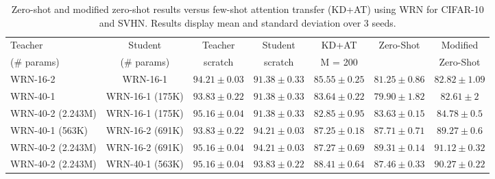 \begin{table}[!ht]
 \begin{adjustwidth}{-1.5cm}{}

    \centering
    \begin{tabular}{lc|ccccc}
    \toprule
    \toprule
         Teacher & Student & Teacher & Student & KD+AT & Zero-Shot & Modified   \\
         (\# params) & (\# params) & scratch & scratch & M = 200 &  & Zero-Shot \\
         \midrule
         WRN-16-2  & WRN-16-1  & $94.21 \pm \scriptstyle{0.03}$ & $91.38\pm \scriptstyle{0.33}$ & $85.55\pm \scriptstyle{0.25}$ & $81.25\pm \scriptstyle{0.86} $ & $82.82\pm \scriptstyle{1.09} $ \\
         WRN-40-1  & WRN-16-1 (175K) & $93.83\pm \scriptstyle{0.22}$ & $91.38\pm \scriptstyle{0.33}$ & $83.64\pm \scriptstyle{0.22}$ & $79.90\pm \scriptstyle{1.82}$ & $82.61\pm \scriptstyle{2}$\\
         WRN-40-2 (2.243M) & WRN-16-1 (175K) & $95.16\pm \scriptstyle{0.04}$ & $91.38\pm \scriptstyle{0.33}$ & $82.85\pm \scriptstyle{0.95}$  & $83.63\pm \scriptstyle{0.15}$ & $84.78\pm \scriptstyle{0.5}$\\
         WRN-40-1 (563K) & WRN-16-2 (691K) & $93.83\pm \scriptstyle{0.22}$ & $94.21\pm \scriptstyle{0.03}$ & $87.25\pm \scriptstyle{0.18}$ & $87.71\pm \scriptstyle{0.71}$ & $89.27\pm \scriptstyle{0.6}$\\ 
         WRN-40-2 (2.243M) & WRN-16-2 (691K) & $95.16\pm \scriptstyle{0.04}$ & $94.21\pm \scriptstyle{0.03}$ & $87.27\pm \scriptstyle{0.69}$ & $89.31\pm \scriptstyle{0.14}$ & $91.12\pm \scriptstyle{0.32}$\\ 
         WRN-40-2 (2.243M) & WRN-40-1 (563K) & $95.16\pm \scriptstyle{0.04}$ & $93.83\pm \scriptstyle{0.22}$ & $88.41\pm \scriptstyle{0.64}$ & $87.46\pm \scriptstyle{0.33}$ & $90.27\pm \scriptstyle{0.22}$\\ 
         \bottomrule 
         \bottomrule
    \end{tabular}
    \vspace{0.25cm}
    \caption{Zero-shot and modified zero-shot results versus few-shot attention transfer (KD+AT) using WRN for CIFAR-10 and SVHN. Results display mean and standard deviation over 3 seeds.}
    \label{olamesa}
\end{adjustwidth}
\vspace{-0.2cm}
\end{table}

